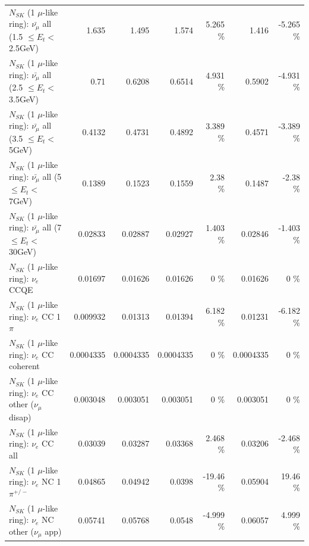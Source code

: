 \begin{table}
\begin{tabular}{| l | r | r | r  r | r  r |}
 $N_{SK}$ (1 $\mu$-like ring): $\bar{\nu_{\mu}}$ all (1.5 $\leq E_{t} <$ 2.5GeV) &           1.635 &           1.495 &           1.574 &    5.265 \%  &           1.416 &   -5.265 \%  \\ 
 $N_{SK}$ (1 $\mu$-like ring): $\bar{\nu_{\mu}}$ all (2.5 $\leq E_{t} <$ 3.5GeV) &            0.71 &          0.6208 &          0.6514 &    4.931 \%  &          0.5902 &   -4.931 \%  \\ 
   $N_{SK}$ (1 $\mu$-like ring): $\bar{\nu_{\mu}}$ all (3.5 $\leq E_{t} <$ 5GeV) &          0.4132 &          0.4731 &          0.4892 &    3.389 \%  &          0.4571 &   -3.389 \%  \\ 
     $N_{SK}$ (1 $\mu$-like ring): $\bar{\nu_{\mu}}$ all (5 $\leq E_{t} <$ 7GeV) &          0.1389 &          0.1523 &          0.1559 &     2.38 \%  &          0.1487 &    -2.38 \%  \\ 
    $N_{SK}$ (1 $\mu$-like ring): $\bar{\nu_{\mu}}$ all (7 $\leq E_{t} <$ 30GeV) &         0.02833 &         0.02887 &         0.02927 &    1.403 \%  &         0.02846 &   -1.403 \%  \\ 
\hline
\hline
\hline
                                      $N_{SK}$ (1 $\mu$-like ring): $\nu_e$ CCQE &         0.01697 &         0.01626 &         0.01626 &        0 \%  &         0.01626 &        0 \%  \\ 
                                 $N_{SK}$ (1 $\mu$-like ring): $\nu_e$ CC 1$\pi$ &        0.009932 &         0.01313 &         0.01394 &    6.182 \%  &         0.01231 &   -6.182 \%  \\ 
                               $N_{SK}$ (1 $\mu$-like ring): $\nu_e$ CC coherent &       0.0004335 &       0.0004335 &       0.0004335 &        0 \%  &       0.0004335 &        0 \%  \\ 
                $N_{SK}$ (1 $\mu$-like ring): $\nu_e$ CC other ($\nu_\mu$ disap) &        0.003048 &        0.003051 &        0.003051 &        0 \%  &        0.003051 &        0 \%  \\ 
                                  $N_{SK}$ (1 $\mu$-like ring): $\nu_{e}$ CC all &         0.03039 &         0.03287 &         0.03368 &    2.468 \%  &         0.03206 &   -2.468 \%  \\ 
\hline
                           $N_{SK}$ (1 $\mu$-like ring): $\nu_e$ NC 1$\pi^{+/-}$ &         0.04865 &         0.04942 &          0.0398 &   -19.46 \%  &         0.05904 &    19.46 \%  \\ 
                  $N_{SK}$ (1 $\mu$-like ring): $\nu_e$ NC other ($\nu_\mu$ app) &         0.05741 &         0.05768 &          0.0548 &   -4.999 \%  &         0.06057 &    4.999 \%  \\ 

\end{tabular}
\end{table}
